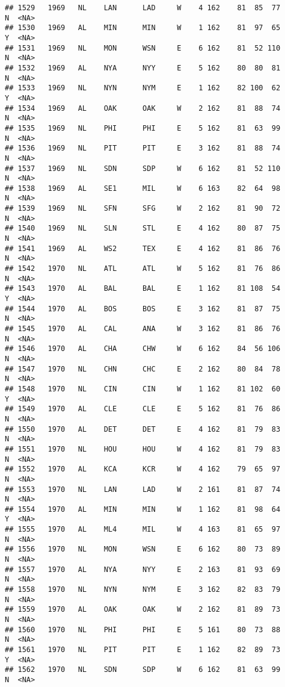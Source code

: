 \documentclass[]{article}
\begin{document}
\begin{verbatim}
## 1529   1969   NL    LAN      LAD     W    4 162    81  85  77      N  <NA>
## 1530   1969   AL    MIN      MIN     W    1 162    81  97  65      Y  <NA>
## 1531   1969   NL    MON      WSN     E    6 162    81  52 110      N  <NA>
## 1532   1969   AL    NYA      NYY     E    5 162    80  80  81      N  <NA>
## 1533   1969   NL    NYN      NYM     E    1 162    82 100  62      Y  <NA>
## 1534   1969   AL    OAK      OAK     W    2 162    81  88  74      N  <NA>
## 1535   1969   NL    PHI      PHI     E    5 162    81  63  99      N  <NA>
## 1536   1969   NL    PIT      PIT     E    3 162    81  88  74      N  <NA>
## 1537   1969   NL    SDN      SDP     W    6 162    81  52 110      N  <NA>
## 1538   1969   AL    SE1      MIL     W    6 163    82  64  98      N  <NA>
## 1539   1969   NL    SFN      SFG     W    2 162    81  90  72      N  <NA>
## 1540   1969   NL    SLN      STL     E    4 162    80  87  75      N  <NA>
## 1541   1969   AL    WS2      TEX     E    4 162    81  86  76      N  <NA>
## 1542   1970   NL    ATL      ATL     W    5 162    81  76  86      N  <NA>
## 1543   1970   AL    BAL      BAL     E    1 162    81 108  54      Y  <NA>
## 1544   1970   AL    BOS      BOS     E    3 162    81  87  75      N  <NA>
## 1545   1970   AL    CAL      ANA     W    3 162    81  86  76      N  <NA>
## 1546   1970   AL    CHA      CHW     W    6 162    84  56 106      N  <NA>
## 1547   1970   NL    CHN      CHC     E    2 162    80  84  78      N  <NA>
## 1548   1970   NL    CIN      CIN     W    1 162    81 102  60      Y  <NA>
## 1549   1970   AL    CLE      CLE     E    5 162    81  76  86      N  <NA>
## 1550   1970   AL    DET      DET     E    4 162    81  79  83      N  <NA>
## 1551   1970   NL    HOU      HOU     W    4 162    81  79  83      N  <NA>
## 1552   1970   AL    KCA      KCR     W    4 162    79  65  97      N  <NA>
## 1553   1970   NL    LAN      LAD     W    2 161    81  87  74      N  <NA>
## 1554   1970   AL    MIN      MIN     W    1 162    81  98  64      Y  <NA>
## 1555   1970   AL    ML4      MIL     W    4 163    81  65  97      N  <NA>
## 1556   1970   NL    MON      WSN     E    6 162    80  73  89      N  <NA>
## 1557   1970   AL    NYA      NYY     E    2 163    81  93  69      N  <NA>
## 1558   1970   NL    NYN      NYM     E    3 162    82  83  79      N  <NA>
## 1559   1970   AL    OAK      OAK     W    2 162    81  89  73      N  <NA>
## 1560   1970   NL    PHI      PHI     E    5 161    80  73  88      N  <NA>
## 1561   1970   NL    PIT      PIT     E    1 162    82  89  73      Y  <NA>
## 1562   1970   NL    SDN      SDP     W    6 162    81  63  99      N  <NA>

\end{verbatim}
\end{document}
